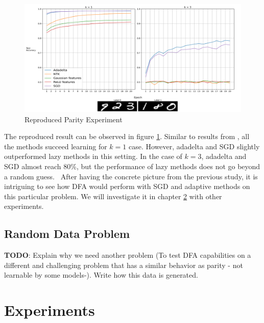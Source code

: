 \documentclass[a4paper, nobind]{templates/ociamthesis}
\begin{document}
\begin{figure}

{\centering \includegraphics[width=1\linewidth]{figures/2_k13_SGD_ada_BP_reproduced} 

}

\caption{Reproduced Parity Experiment \cite{DBLP:journals/corr/abs-2002-07400}}\label{fig:MNISTparity}
\end{figure}

\noindent The reproduced result can be observed in figure \ref{fig:MNISTparity}. Similar to results from \cite{DBLP:journals/corr/abs-2002-07400}, all the methods succeed learning for \(k=1\) case. However, adadelta and SGD slightly outperformed lazy methods in this setting. In the case of \(k=3\), adadelta and SGD almost reach \(80\%\), but the performance of lazy methods does not go beyond a random guess.~
After having the concrete picture from the previous study, it is intriguing to see how DFA would perform with SGD and adaptive methods on this particular problem. We will investigate it in chapter \ref{chap:chapter_3} with other experiments.

\hypertarget{random-data-problem}{%
\section{Random Data Problem}\label{random-data-problem}}

\textbf{TODO}: Explain why we need another problem (To test DFA capabilities on a different and challenging problem that has a similar behavior as parity - not learnable by some models-). Write how this data is generated.

\hypertarget{chap:chapter_3}{%
\chapter{Experiments}\label{chap:chapter_3}}
\end{document}
